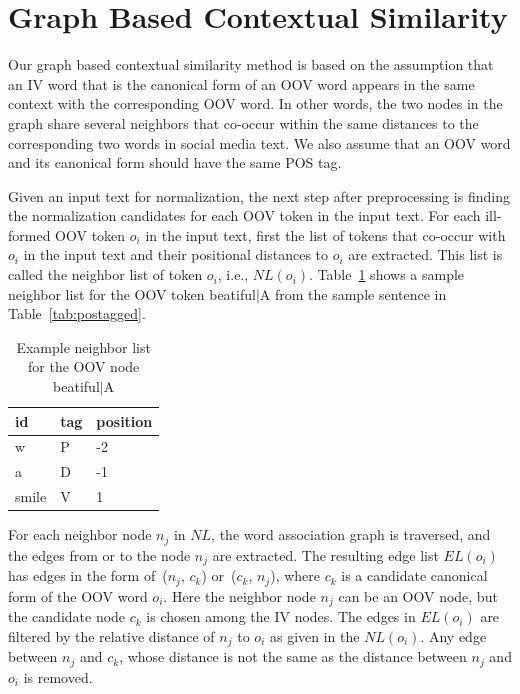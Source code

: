 \documentclass[a4paper,onesided,12pt]{report}
\begin{document}
\section{Graph Based Contextual Similarity}

Our graph based contextual similarity method is based on the assumption that an IV word that is the canonical form of an OOV word appears in the same context with the corresponding OOV word. In other words, the two nodes in the graph share several neighbors that co-occur within the same distances to the corresponding two words in social media text. We also assume that an OOV word and its canonical form should have the same POS tag.

Given an input text for normalization, the next step after preprocessing is finding the normalization candidates for each OOV token in the input text. For each ill-formed OOV token $o_i$ in the input text, first the list of tokens that co-occur with $o_i$ in the input text and their positional distances to $o_i$ are extracted.  This list is called the neighbor list of token $o_i$, i.e.,  $NL(o_i)$. Table~\ref{tab:neigh} shows a sample neighbor list for the OOV token beatiful$|$A from the sample sentence in Table~\ref{tab:postagged}.

\begin{table}[hbt]
\caption{Example neighbor list for the OOV node beatiful$|$A}
\centering
\begin{tabular}{|l|l|l|}
    \hline
    id & tag & position \\
    \hline
    w & P & -2 \\
    a & D & -1 \\
    smile & V & 1 \\
    \hline
  \end{tabular}
\label{tab:neigh}
\end{table}

For each neighbor node $n_{j}$ in $NL$, the word association graph is traversed, and the edges from or to the node $n_{j}$ are extracted. The resulting edge list $EL(o_i)$ has edges in the form of~($n_{j}$, $c_{k}$) or~($c_{k}$, $n_{j}$), where $c_{k}$ is a candidate canonical form of the OOV word $o_i$.
Here the neighbor node $n_{j}$ can be an OOV node, but the candidate node $c_{k}$ is chosen among the IV nodes.
The edges in $EL(o_i)$ are filtered by the relative distance of $n_{j}$ to $o_i$ as given in the $NL(o_i)$. Any edge between  $n_{j}$ and $c_{k}$, whose distance is not the same as the distance between $n_{j}$ and $o_i$ is removed.
\end{document}
